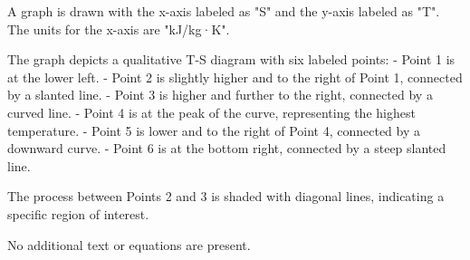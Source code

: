 A graph is drawn with the x-axis labeled as "S" and the y-axis labeled as "T". The units for the x-axis are "kJ/kg·K".  

The graph depicts a qualitative T-S diagram with six labeled points:  
- Point 1 is at the lower left.  
- Point 2 is slightly higher and to the right of Point 1, connected by a slanted line.  
- Point 3 is higher and further to the right, connected by a curved line.  
- Point 4 is at the peak of the curve, representing the highest temperature.  
- Point 5 is lower and to the right of Point 4, connected by a downward curve.  
- Point 6 is at the bottom right, connected by a steep slanted line.  

The process between Points 2 and 3 is shaded with diagonal lines, indicating a specific region of interest.  

No additional text or equations are present.